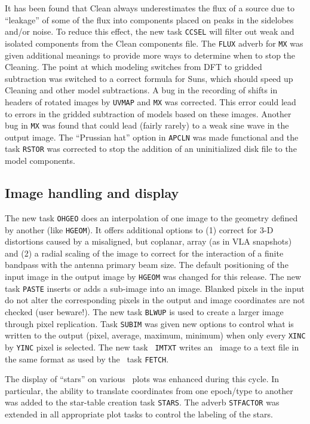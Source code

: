 It has been found that Clean always underestimates the flux of a
source due to ``leakage'' of some of the flux into components placed
on peaks in the sidelobes and/or noise.  To reduce this effect, the
new task {\tt CCSEL} will filter out weak and isolated components from
the Clean components file.  The {\tt FLUX} adverb for {\tt MX} was
given additional meanings to provide more ways to determine when to
stop the Cleaning.  The point at which modeling switches from DFT to
gridded subtraction was switched to a correct formula for Suns, which
should speed up Cleaning and other model subtractions.  A bug in the
recording of shifts in headers of rotated images by {\tt UVMAP} and
{\tt MX} was corrected.  This error could lead to errors in the
gridded subtraction of models based on these images.  Another bug in
{\tt MX} was found that could lead (fairly rarely) to a weak sine wave
in the output image.  The ``Prussian hat'' option in {\tt APCLN} was
made functional and the task {\tt RSTOR} was corrected to stop the
addition of an uninitialized disk file to the model components.

\subsection{Image handling and display}

The new task {\tt OHGEO} does an interpolation of one image to the
geometry defined by another (like {\tt HGEOM}).  It offers additional
options to (1) correct for 3-D distortions caused by a misaligned, but
coplanar, array (as in VLA snapshots) and (2) a radial scaling of the
image to correct for the interaction of a finite bandpass with the
antenna primary beam size.  The default positioning of the input image
in the output image by {\tt HGEOM} was changed for this release.  The
new task {\tt PASTE} inserts or adds a sub-image into an image.
Blanked pixels in the input do not alter the corresponding pixels in
the output and image coordinates are not checked (user beware!).  The
new task {\tt BLWUP} is used to create a larger image through pixel
replication.  Task {\tt SUBIM} was given new options to control what
is written to the output (pixel, average, maximum, minimum) when only
every {\tt XINC} by {\tt YINC} pixel is selected.  The new task {\tt
IMTXT} writes an \AIPS\ image to a text file in the same format as
used by the \AIPS\ task \hbox{{\tt FETCH}}.

The display of ``stars'' on various \AIPS\ plots was enhanced during
this cycle.  In particular, the ability to translate coordinates from
one epoch/type to another was added to the star-table creation task
\hbox{{\tt STARS}}.  The adverb {\tt STFACTOR} was extended in all
appropriate plot tasks to control the labeling of the stars.

